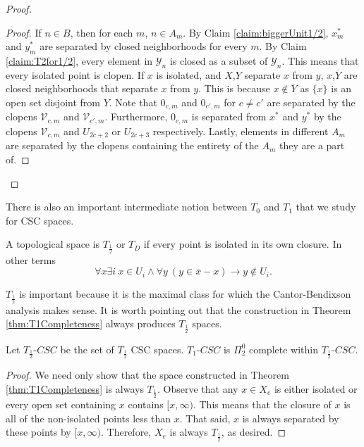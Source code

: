 \documentclass[11pt]{amsart}
\theoremstyle{remark}
\begin{document}
\begin{proof}
\begin{proof}
        If $n\in B$, then for each $m$, $n\in A_m$.
        By Claim \ref{claim:biggerUnit1/2}, $x^*_m$ and $y^*_m$ are separated by closed neighborhoods for every $m$.
        By Claim \ref{claim:T2for1/2}, every element in $\mathcal{Y}_n$ is closed as a subset of $\mathcal{Y}_n$.
        This means that every isolated point is clopen.
        If $x$ is isolated, and $X$,$Y$ separate $x$ from $y$, $x$,$\overline{Y}$ are closed neighborhoods that separate $x$ from $y$.
        This is because $x\not\in \overline{Y}$ as $\{x\}$ is an open set disjoint from $Y$.
        Note that $0_{c,m}$ and $0_{c',m}$ for $c\neq c'$ are separated by the clopens $\mathcal{V}_{c,m}$ and $\mathcal{V}_{c',m}$.
        Furthermore, $0_{c,m}$ is separated from $x^*$ and $y^*$ by the clopens $\mathcal{V}_{c,m}$ and $U_{2c+2}$ or $U_{2c+3}$ respectively.
        Lastly, elements in different $A_m$ are separated by the clopens containing the entirety of the $A_m$ they are a part of.
    \end{proof}

    \end{proof}

    There is also an important intermediate notion between $T_0$ and $T_1$ that we study for CSC spaces.


    \begin{definition}
        A topological space is $T_{\frac12}$ or $T_D$ if every point is isolated in its own closure. In other terms
        \[\forall x \exists i ~ x\in U_i\land \forall y ~ (y\in\overline{x}-x)\to y\notin U_i.\]
    \end{definition}

    $T_{\frac12}$ is important because it is the maximal class for which the Cantor-Bendixson analysis makes sense.
    It is worth pointing out that the construction in Theorem \ref{thm:T1Completeness} always produces $T_{\frac12}$ spaces.

    \begin{corollary}
    Let $T_{\frac12}$-$CSC$ be the set of $T_{\frac12}$ CSC spaces.
    $T_1$-$CSC$ is $\Pi_2^0$ complete within $T_{\frac12}$-$CSC$.
    \end{corollary}

    \begin{proof}
        We need only show that the space constructed in Theorem \ref{thm:T1Completeness} is always $T_{\frac12}$.
        Observe that any $x\in X_e$ is either isolated or every open set containing $x$ contains $[x,\infty)$.
        This means that the closure of $x$ is all of the non-isolated points less than $x$.
        That said, $x$ is always separated by these points by $[x,\infty)$.
        Therefore, $X_e$ is always $T_{\frac12}$, as desired.
    \end{proof}
\end{document}
